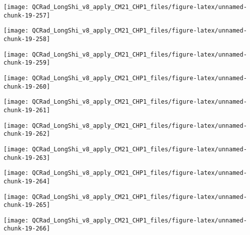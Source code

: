 \documentclass[
  10pt,
  a4paper,oneside]{article}
\begin{document}
\begin{center}\texttt{[image: QCRad\_LongShi\_v8\_apply\_CM21\_CHP1\_files/figure-latex/unnamed-chunk-19-257]} \end{center}

\begin{center}\texttt{[image: QCRad\_LongShi\_v8\_apply\_CM21\_CHP1\_files/figure-latex/unnamed-chunk-19-258]} \end{center}

\begin{center}\texttt{[image: QCRad\_LongShi\_v8\_apply\_CM21\_CHP1\_files/figure-latex/unnamed-chunk-19-259]} \end{center}

\begin{center}\texttt{[image: QCRad\_LongShi\_v8\_apply\_CM21\_CHP1\_files/figure-latex/unnamed-chunk-19-260]} \end{center}

\begin{center}\texttt{[image: QCRad\_LongShi\_v8\_apply\_CM21\_CHP1\_files/figure-latex/unnamed-chunk-19-261]} \end{center}

\begin{center}\texttt{[image: QCRad\_LongShi\_v8\_apply\_CM21\_CHP1\_files/figure-latex/unnamed-chunk-19-262]} \end{center}

\begin{center}\texttt{[image: QCRad\_LongShi\_v8\_apply\_CM21\_CHP1\_files/figure-latex/unnamed-chunk-19-263]} \end{center}

\begin{center}\texttt{[image: QCRad\_LongShi\_v8\_apply\_CM21\_CHP1\_files/figure-latex/unnamed-chunk-19-264]} \end{center}

\begin{center}\texttt{[image: QCRad\_LongShi\_v8\_apply\_CM21\_CHP1\_files/figure-latex/unnamed-chunk-19-265]} \end{center}

\begin{center}\texttt{[image: QCRad\_LongShi\_v8\_apply\_CM21\_CHP1\_files/figure-latex/unnamed-chunk-19-266]} \end{center}
\end{document}

